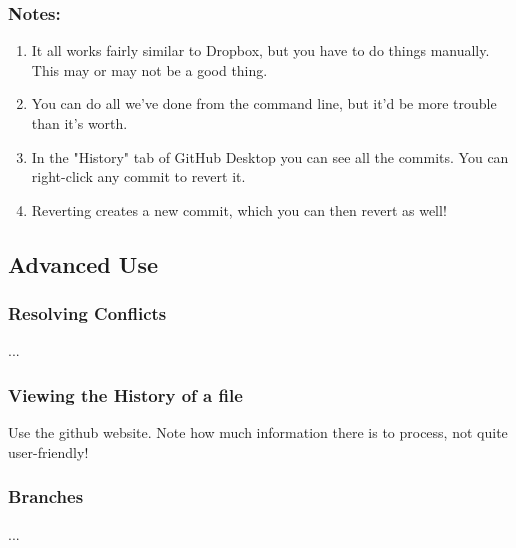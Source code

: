 \documentclass{beamer}
\begin{document}
\begin{frame}
	\frametitle{Notes:}
	\begin{enumerate}
		\item It all works fairly similar to Dropbox, but you have to do things manually. This may or may not be a good thing.
		\item You can do all we've done from the command line, but it'd be more trouble than it's worth.
		\item In the "History" tab of GitHub Desktop you can see all the commits. You can right-click any commit to revert it. 
		\item Reverting creates a new commit, which you can then revert as well!
	\end{enumerate}
\end{frame}

\subsection{Advanced Use}
\begin{frame}
	\frametitle{Resolving Conflicts}
	...
\end{frame}


\begin{frame}
	\frametitle{Viewing the History of a file}
	Use the github website. Note how much information there is to process, not quite user-friendly!
\end{frame}

\begin{frame}
	\frametitle{Branches}
	...
\end{frame}



\end{document}
